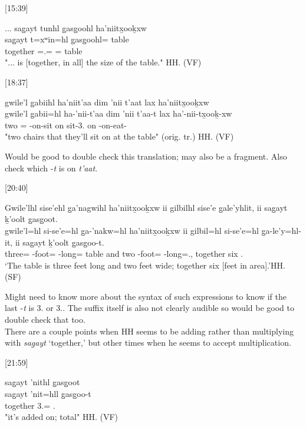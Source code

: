 [15:39]
\begin{exe}
    \ex \glll
    ... sag̱ayt tunhl g̱asg̱oohl ha’niitx̱ooḵxw \\
    {} sag̱ayt t=xʷin=hl g̱asg̱oohl=\Cn{} table \\
    {} together \Pn=\Dem.\Prox=\Cn{} \Mass=\Cn{} table \\
    \glt "... is [together, in all] the size of the table." \hfill HH.\ElicitationDate{} (VF)
\end{exe}

[18:37]
\begin{exe}
    \ex \glll
    gwile'l g̱abiihl ha'niit'aa dim 'nii t'aat lax ha’niitx̱ooḵxw \\
    gwile'l g̱abii=hl ha-'nii-t'aa dim 'nii t'aa-t lax ha’-nii-tx̱ooḵ-xw \\
    two \Cnt=\Cn{} \Ins-on-sit \Prosp{} on sit-3.\Sx{} on \Ins-on-eat-\Val 
    \\
    \glt "two chairs that they'll sit on at the table" (orig. tr.) \hfill HH.\ElicitationDate{} (VF)
\end{exe}

Would be good to double check this translation; may also be a fragment. Also check which -\textit{t} is on \textit{t'aat}.

[20:40]
\begin{exe}
    \ex \glll Gwile'lhl sise’ehl g̱a’nagwihl ha’niitx̱ooḵxw ii gilbilhl sise’e g̱ale’yhlit, ii sag̱ayt ḵ’oolt g̱asg̱oot. \\
    gwile'l=hl si-se’e=hl g̱a-’nakw=hl ha’niitx̱ooḵxw ii gilbil=hl si-se’e=hl   g̱a-le’y=hl-it, ii sag̱ayt ḵ'oolt g̱asg̱oo-t. \\
    three=\Cn{} \Pl-foot=\Cn{} \Distr-long=\Cn{} table and two \Pl-foot=\Cn{} \Distr-long=.\Ii, \Ccnj{} together six .\Ii \\ 
    \glt `The table is three feet long and two feet wide; together six [feet in area].'\hfill HH.\ElicitationDate{} (SF)
\end{exe}

Might need to know more about the syntax of such expressions to know if the last -\textit{t} is 3.\I{} or 3.\Ii. The suffix itself is also not clearly audible so would be good to double check that too. \\

There are a couple points when HH seems to be adding rather than multiplying with \textit{sag̱ayt} `together,' but other times when he seems to accept multiplication. 

[21:59]
\begin{exe}
    \ex \glll
    sag̱ayt ’nithl g̱asg̱oot \\
    sag̱ayt ’nit=hll g̱asg̱oo-t \\
    together 3.\Iii=\Cn{} .\Ii \\
    \glt "it's added on; total" \hfill HH.\ElicitationDate{} (VF)
\end{exe}


